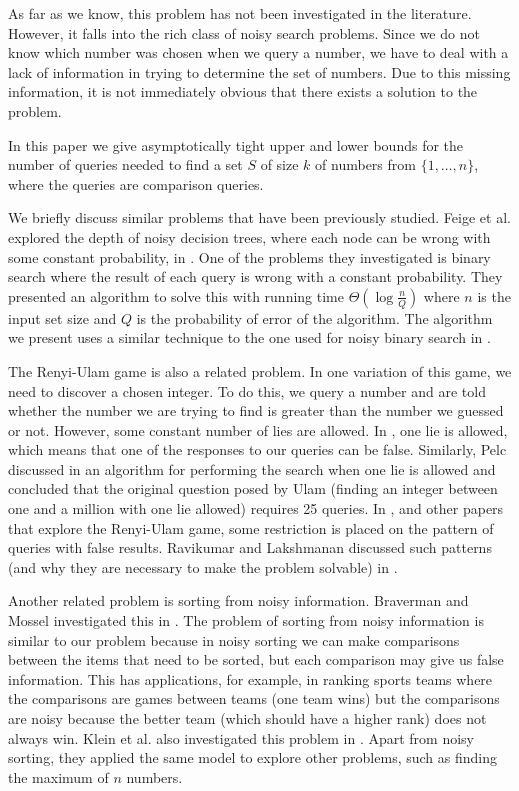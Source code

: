 \documentclass[12pt]{article}
\begin{document}
As far as we know, this problem has not been investigated in the literature. However, it falls into the rich class of noisy search problems. Since we do not know which number was chosen when we query a number, we have to deal with a lack of information in trying to determine the set of numbers. Due to this missing information, it is not immediately obvious that there exists a solution to the problem. 

In this paper we give asymptotically tight upper and lower bounds for the number of queries needed to find a set $S$ of size $k$ of numbers from $\{1,\ldots,n\}$, where the queries are comparison queries. 

We briefly discuss similar problems that have been previously studied. Feige et al. explored the depth of noisy decision trees, where each node can be wrong with some constant probability, in \cite{Feige}. One of the problems they investigated is binary search where the result of each query is wrong with a constant probability. They presented an algorithm to solve this with running time $\Theta(\log{\frac{n}{Q}})$ where $n$ is the input set size and $Q$ is the probability of error of the algorithm. The algorithm we present uses a similar technique to the one used for noisy binary search in \cite{Feige}. 

The Renyi-Ulam game is also a related problem. In one variation of this game, we need to discover a chosen integer. To do this, we query a number and are told whether the number we are trying to find is greater than the number we guessed or not. However, some constant number of lies are allowed. In \cite{Spencer}, one lie is allowed, which means that one of the responses to our queries can be false. Similarly, Pelc discussed in \cite{Pelc} an algorithm for performing the search when one lie is allowed and concluded that the original question posed by Ulam (finding an integer between one and a million with one lie allowed) requires 25 queries. In \cite{Spencer}, \cite{Pelc} and other papers that explore the Renyi-Ulam game, some restriction is placed on the pattern of queries with false results. Ravikumar and Lakshmanan discussed such patterns (and why they are necessary to make the problem solvable) in \cite{Ravikumar}.

Another related problem is sorting from noisy information. Braverman and Mossel investigated this in \cite{Braverman}. The problem of sorting from noisy information is similar to our problem because in noisy sorting we can make comparisons between the items that need to be sorted, but each comparison may give us false information. This has applications, for example, in ranking sports teams where the comparisons are games between teams (one team wins) but the comparisons are noisy because the better team (which should have a higher rank) does not always win. Klein et al. also investigated this problem in \cite{Klein}. Apart from noisy sorting, they applied the same model to explore other problems, such as finding the maximum of $n$ numbers.
\end{document}
